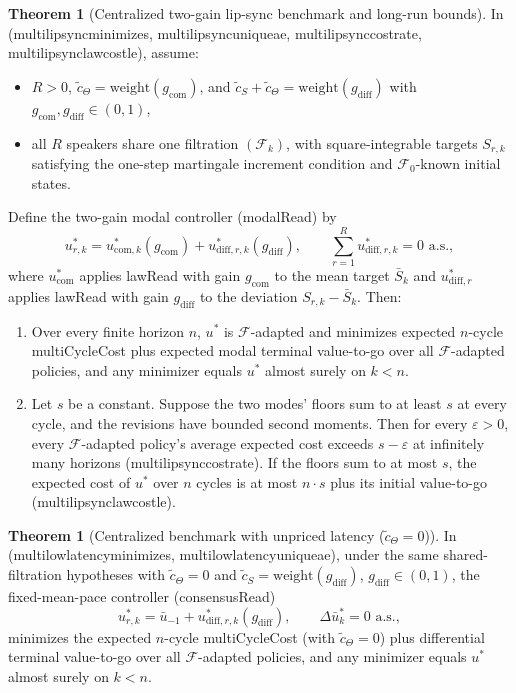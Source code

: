 \documentclass[11pt,a4paper]{article}
\DeclareRobustCommand{\lean}[1]{{\ttfamily\def\_{\textunderscore\allowbreak}#1}}
\theoremstyle{definition}
\newtheorem{theorem}[definition]{Theorem}
\begin{document}
\begin{theorem}[Centralized two-gain lip-sync benchmark and long-run bounds]
\label{thm:lipsync-opt}
In  (\lean{multi\_lipsync\_minimizes},
\lean{multi\_lipsync\_unique\_ae}, \lean{multi\_lipsync\_cost\_rate},
\lean{multi\_lipsync\_law\_cost\_le}), assume:
\begin{itemize}
\item $R > 0$, $\tilde c_\Theta = \mathrm{weight}(g_{\mathrm{com}})$, and
  $\tilde c_S + \tilde c_\Theta = \mathrm{weight}(g_{\mathrm{diff}})$ with
  $g_{\mathrm{com}}, g_{\mathrm{diff}} \in (0, 1)$,
\item all $R$ speakers share one filtration $(\mathcal{F}_k)$, with
  square-integrable targets $S_{r,k}$ satisfying the one-step martingale
  increment condition and $\mathcal{F}_0$-known initial states.
\end{itemize}
Define the two-gain modal controller (\lean{modalRead}) by
\[
  u_{r,k}^* = u_{\mathrm{com},k}^*(g_{\mathrm{com}})
            + u_{\mathrm{diff},r,k}^*(g_{\mathrm{diff}}),
  \qquad \sum_{r=1}^R u_{\mathrm{diff},r,k}^* = 0\text{ a.s.},
\]
where $u_{\mathrm{com}}^*$ applies \lean{lawRead} with gain $g_{\mathrm{com}}$
to the mean target $\bar S_k$ and $u_{\mathrm{diff},r}^*$ applies
\lean{lawRead} with gain $g_{\mathrm{diff}}$ to the deviation $S_{r,k} - \bar S_k$.
Then:
\begin{enumerate}
\item Over every finite horizon $n$, $u^*$ is $\mathcal{F}$-adapted and
  minimizes expected $n$-cycle \lean{multiCycleCost} plus expected modal
  terminal value-to-go over all $\mathcal{F}$-adapted policies, and any
  minimizer equals $u^*$ almost surely on $k < n$.
\item Let $s$ be a constant. Suppose the two modes' floors sum to at least $s$
  at every cycle, and the revisions have bounded second moments. Then for every
  $\varepsilon > 0$, every $\mathcal{F}$-adapted policy's average expected cost
  exceeds $s - \varepsilon$ at infinitely many horizons
  (\lean{multi\_lipsync\_cost\_rate}). If the floors sum to at most $s$, the
  expected cost of $u^*$ over $n$ cycles is at most $n \cdot s$ plus its
  initial value-to-go (\lean{multi\_lipsync\_law\_cost\_le}).
\end{enumerate}
\end{theorem}

\begin{theorem}[Centralized benchmark with unpriced latency ($\tilde c_\Theta = 0$)]
\label{thm:lowlat-opt}
In  (\lean{multi\_lowlatency\_minimizes},
\lean{multi\_lowlatency\_unique\_ae}), under the same shared-filtration
hypotheses with $\tilde c_\Theta = 0$ and $\tilde c_S = \mathrm{weight}(g_{\mathrm{diff}})$,
$g_{\mathrm{diff}} \in (0, 1)$, the fixed-mean-pace controller
(\lean{consensusRead})
\[
  u_{r,k}^* = \bar u_{-1} + u_{\mathrm{diff},r,k}^*(g_{\mathrm{diff}}),
  \qquad \Delta \bar u_k^* = 0\text{ a.s.},
\]
minimizes the expected $n$-cycle \lean{multiCycleCost} (with $\tilde c_\Theta = 0$)
plus differential terminal value-to-go over all $\mathcal{F}$-adapted policies,
and any minimizer equals $u^*$ almost surely on $k < n$.
\end{theorem}
\end{document}
